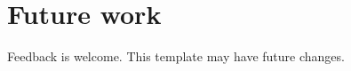 \chapter{Future work}
\label{ch:future-work}

Feedback is welcome. This template may have future changes.
